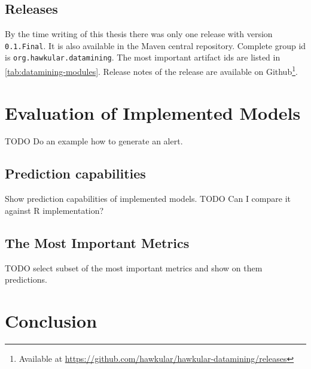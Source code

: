     \section{Releases}
    By the time writing of this thesis there was only one release with version \texttt{0.1.Final}. It is also available
    in the Maven central repository. Complete group id is \texttt{org.hawkular.datamining}. The most important
    artifact ids are listed in \ref{tab:datamining-modules}. Release notes of the release are available on
    Github\footnote{Available at \url{https://github.com/hawkular/hawkular-datamining/releases}}.

\chapter{Evaluation of Implemented Models}
TODO Do an example how to generate an alert.

    \section{Prediction capabilities}
    Show prediction capabilities of implemented models.
    TODO Can I compare it against R implementation?

    \section{The Most Important Metrics}
    TODO select subset of the most important metrics and show on them predictions.

\chapter{Conclusion}

